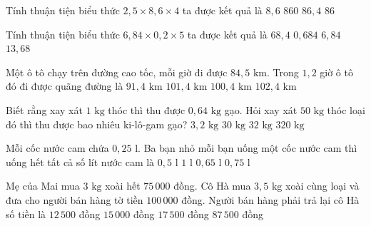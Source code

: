 \begin{ex} %
Tính thuận tiện biểu thức $2{,}5 \times 8{,}6 \times 4$ ta được kết quả là
\choice
{$8{,}6$}
{$860$}
{$86{,}4$}
{\True $86$}
\end{ex}

\begin{ex} %
Tính thuận tiện biểu thức $6{,}84 \times 0{,}2 \times 5$ ta được kết quả là
\choice
{$68{,}4$}
{$0{,}684$}
{\True $6{,}84$}
{$13{,}68$}
\end{ex}

\begin{ex} %
Một ô tô chạy trên đường cao tốc, mỗi giờ đi được $84{,}5\text{ km}$. Trong $1{,}2$ giờ ô tô đó đi được quãng đường là
\choice
{$91{,}4\text{ km}$}
{\True $101{,}4\text{ km}$}
{$100{,}4\text{ km}$}
{$102{,}4\text{ km}$}
\end{ex}

\begin{ex} %
Biết rằng xay xát $1\text{ kg}$ thóc thì thu được $0{,}64\text{ kg}$ gạo. Hỏi xay xát $50\text{ kg}$ thóc loại đó thì thu được bao nhiêu ki-lô-gam gạo?
\choice
{$3{,}2\text{ kg}$}
{$30\text{ kg}$}
{\True $32\text{ kg}$}
{$320\text{ kg}$}
\end{ex}

\begin{ex} %
Mỗi cốc nước cam chứa $0{,}25\text{ l}$. Ba bạn nhỏ mỗi bạn uống một cốc nước cam thì uống hết tất cả số lít nước cam là
\choice
{$0{,}5\text{ l}$}
{$1\text{ l}$}
{$0{,}65\text{ l}$}
{\True $0{,}75\text{ l}$}
\end{ex}

\begin{ex} %
Mẹ của Mai mua $3\text{ kg}$ xoài hết $75\,000$ đồng. Cô Hà mua $3{,}5\text{ kg}$ xoài cùng loại và đưa cho người bán hàng tờ tiền $100\,000$ đồng. Người bán hàng phải trả lại cô Hà số tiền là
\choice
{\True $12\,500$ đồng}
{$15\,000$ đồng}
{$17\,500$ đồng}
{$87\,500$ đồng}
\end{ex}


